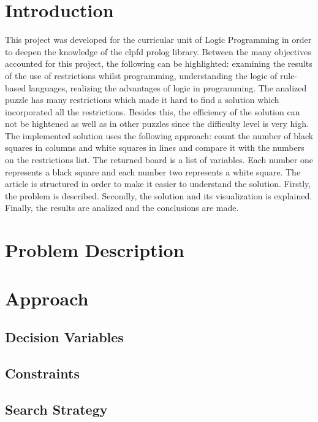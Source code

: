 \documentclass[runningheads,a4paper]{llncs}
\begin{document}
\section{Introduction}

This project was developed for the curricular unit of Logic Programming in order to deepen the knowledge of the clpfd prolog library. Between the many objectives accounted for this project, the following can be highlighted: examining the results of the use of restrictions whilst programming, understanding the logic of rule-based languages, realizing the advantages of logic in programming. The analized puzzle has many restrictions which made it hard to find a solution which incorporated all the restrictions. Besides this, the efficiency of the solution can not be hightened as well as in other puzzles since the difficulty level is very high. The implemented solution uses the following approach: count the number of black squares in columns and white squares in lines and compare it with the numbers on the restrictions list. The returned board is a list of variables. Each number one represents a black square and each number two represents a white square. 
The article is structured in order to make it easier to understand the solution. Firstly, the problem is described. Secondly, the solution and its visualization is explained. Finally, the results are analized and the conclusions are made. 

\section {Problem Description}



\section {Approach}



\subsection{Decision Variables}

\subsection{Constraints}

\subsection{Search Strategy}
\end{document}
